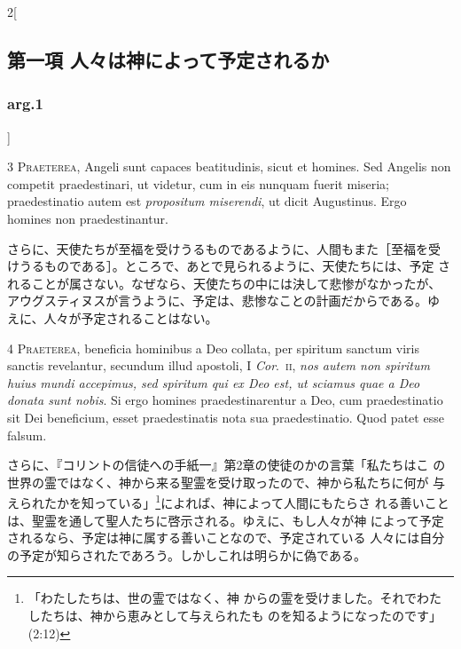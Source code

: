 \documentclass[paper=a4paper,fontsize=10pt,jafontsize=9pt,titlepage]{jlreq}
\begin{document}
\begin{paracol}{2}[\subsection{第一項 人々は神によって予定されるか}\subsubsection{arg.1}]


{\scshape 3 Praeterea}, Angeli sunt capaces
beatitudinis, sicut et homines. Sed Angelis non competit praedestinari,
ut videtur, cum in eis nunquam fuerit miseria; praedestinatio autem est
{\itshape propositum miserendi}, ut dicit Augustinus. Ergo homines non
praedestinantur.


\switchcolumn


さらに、天使たちが至福を受けうるものであるように、人間もまた［至福を受
けうるものである］。ところで、あとで見られるように、天使たちには、予定
されることが属さない。なぜなら、天使たちの中には決して悲惨がなかったが、
アウグスティヌスが言うように、予定は、悲惨なことの計画だからである。ゆ
えに、人々が予定されることはない。




{\scshape 4 Praeterea}, beneficia hominibus a Deo
collata, per spiritum sanctum viris sanctis revelantur, secundum illud
apostoli, I {\itshape Cor}.~{\scshape ii}, {\itshape nos autem non spiritum huius mundi accepimus, sed
spiritum qui ex Deo est, ut sciamus quae a Deo donata sunt nobis}. Si
ergo homines praedestinarentur a Deo, cum praedestinatio sit Dei
beneficium, esset praedestinatis nota sua praedestinatio. Quod patet
esse falsum.


\switchcolumn


さらに、『コリントの信徒への手紙一』第2章の使徒のかの言葉「私たちはこ
の世界の霊ではなく、神から来る聖霊を受け取ったので、神から私たちに何が
与えられたかを知っている」\footnote{「わたしたちは、世の霊ではなく、神
からの霊を受けました。それでわたしたちは、神から恵みとして与えられたも
のを知るようになったのです」(2:12)}によれば、神によって人間にもたらさ
れる善いことは、聖霊を通して聖人たちに啓示される。ゆえに、もし人々が神
によって予定されるなら、予定は神に属する善いことなので、予定されている
人々には自分の予定が知らされたであろう。しかしこれは明らかに偽である。


\switchcolumn*[\subsubsection{s.c.}]



\end{paracol}
\end{document}
